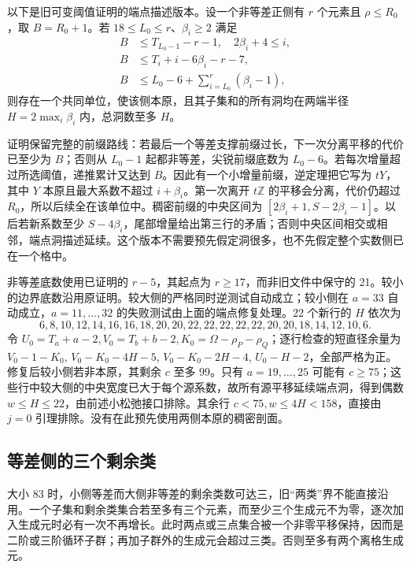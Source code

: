 \documentclass[11pt,a4paper]{article}
\begin{document}
以下是旧可变阈值证明的端点描述版本。设一个非等差正侧有 \(r\) 个元素且
\(\rho\le R_0\)，取 \(B=R_0+1\)。若 \(18\le L_0\le r\)、\(\beta_i\ge2\)
满足 \[
 \begin{aligned}
 B&\le T_{L_0-1}-r-1,\quad 2\beta_i+4\le i,\\
 B&\le T_i+i-6\beta_i-r-7,\\
 B&\le L_0-6+\sum_{i=L_0}^r(\beta_i-1),
 \end{aligned}
\] 则存在一个共同单位，使该侧本原，且其子集和的所有洞均在两端半径
\(H=2\max_i\beta_i\) 内，总洞数至多 \(H\)。

证明保留完整的前缀路线：若最后一个等差支撑前缀过长，下一次分离平移的代价已至少为
\(B\)；否则从 \(L_0-1\) 起都非等差，尖锐前缀底数为
\(L_0-6\)。若每次增量超过所选阈值，递推累计又达到
\(B\)。因此有一个小增量前缀，逆定理把它写为 \(tY\)，其中 \(Y\)
本原且最大系数不超过 \(i+\beta_i\)。第一次离开 \(t\mathbb Z\)
的平移会分离，代价仍超过
\(R_0\)，所以后续全在该单位中。稠密前缀的中央区间为
\([2\beta_i+1,S-2\beta_i-1]\)。以后若新系数至少
\(S-4\beta_i\)，尾部增量给出第三行的矛盾；否则中央区间相交或相邻，端点洞描述延续。这个版本不需要预先假定洞很多，也不先假定整个实数侧已在一个格中。

非等差底数使用已证明的 \(r-5\)，其起点为 \(r\ge17\)，而非旧文件中保守的
21。较小的边界底数沿用原证明。较大侧的严格同时逆测试自动成立；较小侧在
\(a=33\) 自动成立，\(a=11,\ldots,32\) 的失败测试由上面的端点修复处理。22
个新行的 \(H\) 依次为 \[
6,8,10,12,14,16,16,18,20,20,22,22,22,22,22,20,20,18,14,12,10,6.
\] 令
\(U_0=T_a+a-2,V_0=T_b+b-2,K_0=\Omega-\rho_P-\rho_Q\)；逐行检查的短直径余量为
\(V_0-1-K_0\), \(V_0-K_0-4H-5\), \(V_0-K_0-2H-4\),
\(U_0-H-2\)，全部严格为正。修复后较小侧若非本原，其剩余 \(c\) 至多
99。只有 \(a=19,\ldots,25\) 可能有
\(c\ge75\)；这些行中较大侧的中央宽度已大于每个源系数，故所有源平移延续端点洞，得到偶数
\(w\le H\le22\)，由前述小松弛接口排除。其余行
\(c<75,w\le4H<158\)，直接由 \(j=0\)
引理排除。没有在此预先使用两侧本原的稠密剖面。

\hypertarget{ux7b49ux5deeux4fa7ux7684ux4e09ux4e2aux5269ux4f59ux7c7b}{%
\subsection{等差侧的三个剩余类}\label{ux7b49ux5deeux4fa7ux7684ux4e09ux4e2aux5269ux4f59ux7c7b}}

大小 83
时，小侧等差而大侧非等差的剩余类数可达三，旧``两类''界不能直接沿用。一个子集和剩余类集合若至多有三个元素，而至少三个生成元不为零，逐次加入生成元时必有一次不再增长。此时两点或三点集合被一个非零平移保持，因而是二阶或三阶循环子群；再加子群外的生成元会超过三类。否则至多有两个离格生成元。
\end{document}
